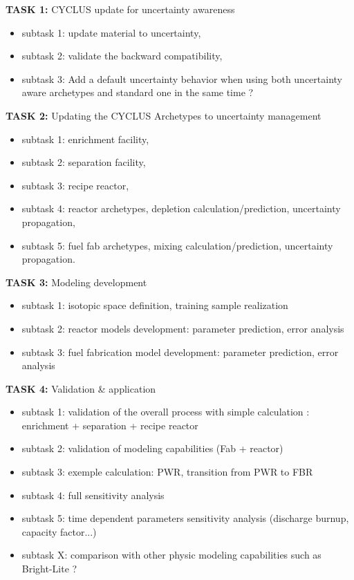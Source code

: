 \documentclass[dvips,12pt]{article}
\begin{document}
\noindent\textbf{TASK 1:} CYCLUS update for uncertainty awareness
\begin{itemize}
\item subtask 1: update material to uncertainty,
\item subtask 2: validate the backward
  compatibility,
\item subtask 3: Add a default uncertainty
  behavior when using both uncertainty aware
  archetypes and standard one in the same time ?
\end{itemize}

\noindent\textbf{TASK 2:} Updating the CYCLUS Archetypes to uncertainty management
\begin{itemize}
\item subtask 1: enrichment facility, 
\item subtask 2: separation facility,
\item subtask 3: recipe reactor,
\item subtask 4: reactor archetypes, depletion
  calculation/prediction, uncertainty propagation,
\item subtask 5: fuel fab archetypes, mixing
  calculation/prediction, uncertainty propagation.
\end{itemize}

\noindent\textbf{TASK 3:} Modeling development
\begin{itemize}
\item subtask 1: isotopic space definition,
  training sample realization
\item subtask 2: reactor models development:
  parameter prediction, error analysis
\item subtask 3: fuel fabrication model
  development: parameter prediction, error
  analysis
\end{itemize}
 
\noindent\textbf{TASK 4:} Validation \& application
\begin{itemize}
\item subtask 1: validation of the overall process
  with simple calculation : enrichment +
  separation + recipe reactor
\item subtask 2: validation of modeling
  capabilities (Fab + reactor)

\item subtask 3: exemple calculation: PWR,
  transition from PWR to FBR
\item subtask 4: full sensitivity analysis

\item subtask 5: time dependent parameters
  sensitivity analysis (discharge burnup, capacity
  factor...)

\item subtask X: comparison with other physic
  modeling capabilities such as Bright-Lite ?
\end{itemize}
\end{document}
